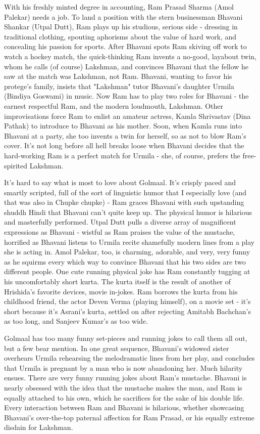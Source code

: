 \documentclass{article}
\begin{document}
With his freshly minted degree in accounting, Ram Prasad Sharma (Amol Palekar) needs a job.  To land a position with the stern businessman Bhavani Shankar (Utpal Dutt), Ram plays up his studious, serious side - dressing in traditional clothing, spouting aphorisms about the value of hard work, and concealing his passion for sports.  After Bhavani spots Ram skiving off work to watch a hockey match, the quick-thinking Ram invents a no-good, layabout twin, whom he calls (of course) Lakshman, and convinces Bhavani that the fellow he saw at the match was Lakshman, not Ram.  Bhavani, wanting to favor his protege's family, insists that "Lakshman" tutor Bhavani's daughter Urmila (Bindiya Goswami) in music.  Now Ram has to play two roles for Bhavani - the earnest respectful Ram, and the modern loudmouth, Lakshman.  Other improvisations force Ram to enlist an amateur actress, Kamla Shrivastav (Dina Pathak) to introduce to Bhavani as his mother.  Soon, when Kamla runs into Bhavani at a party, she too invents a twin for herself, so as not to blow Ram's cover.  It's not long before all hell breaks loose when Bhavani decides that the hard-working Ram is a perfect match for Urmila - she, of course, prefers the free-spirited Lakshman.

It's hard to say what is most to love about Golmaal.  It's crisply paced and smartly scripted, full of the sort of linguistic humor that I especially love (and that was also in Chupke chupke) - Ram graces Bhavani with such upstanding shuddh Hindi that Bhavani can't quite keep up.  The physical humor is hilarious and masterfully performed.  Utpal Dutt pulls a diverse array of magnificent expressions as Bhavani - wistful as Ram praises the value of the mustache, horrified as Bhavani listens to Urmila recite shamefully modern lines from a play she is acting in.  Amol Palekar, too, is charming, adorable, and very, very funny as he squirms every which way to convince Bhavani that his two sides are two different people.  One cute running physical joke has Ram constantly tugging at his uncomfortably short kurta.  The kurta itself is the result of another of Hrishida's favorite devices, movie in-jokes.  Ram borrows the kurta from his childhood friend, the actor Deven Verma (playing himself), on a movie set - it's short because it's Asrani's kurta, settled on after rejecting Amitabh Bachchan's as too long, and Sanjeev Kumar's as too wide.

Golmaal has too many funny set-pieces and running jokes to call them all out, but a few bear mention.  In one great sequence, Bhavani's widowed sister overhears Urmila rehearsing the melodramatic lines from her play, and concludes that Urmila is pregnant by a man who is now abandoning her.  Much hilarity ensues.  There are very funny running jokes about Ram's mustache.  Bhavani is nearly obsessed with the idea that the mustache makes the man, and Ram is equally attached to his own, which he sacrifices for the sake of his double life.  Every interaction between Ram and Bhavani is hilarious, whether showcasing Bhavani's over-the-top paternal affection for Ram Prasad, or his equally extreme disdain for Lakshman. 
\end{document}
